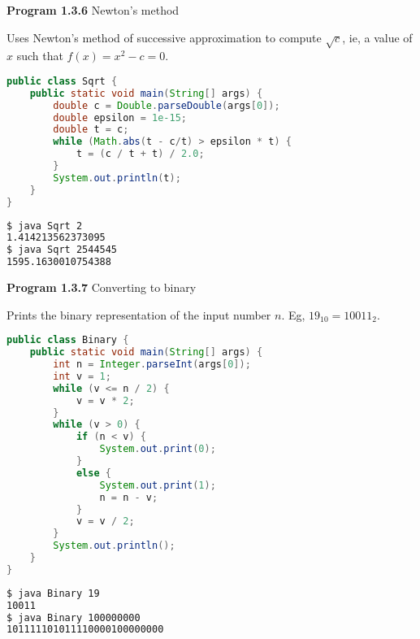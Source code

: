\documentclass[8pt,a4paper,compress]{beamer}
\begin{document}
\begin{frame}[fragile]
\pause

\textbf{Program 1.3.6} Newton's method

\begin{framed}
\tiny Uses Newton's method of successive approximation to compute $\sqrt{c}$, ie, a value of $x$ such that $f(x)=x^2-c=0$.
\end{framed}

\begin{lstlisting}[language=Java]
public class Sqrt { 
    public static void main(String[] args) { 
        double c = Double.parseDouble(args[0]);
        double epsilon = 1e-15;
        double t = c; 
        while (Math.abs(t - c/t) > epsilon * t) {
            t = (c / t + t) / 2.0;
        }
        System.out.println(t);
    }
}
\end{lstlisting}

\pause

\begin{lstlisting}[language=bash]
$ java Sqrt 2
1.414213562373095
$ java Sqrt 2544545
1595.1630010754388
\end{lstlisting}
\end{frame}

\begin{frame}[fragile]
\pause

\textbf{Program 1.3.7} Converting to binary

\begin{framed}
\tiny Prints the binary representation of the input number $n$. Eg, $19_{10}=10011_{2}$.
\end{framed}

\begin{lstlisting}[language=Java]
public class Binary { 
    public static void main(String[] args) { 
        int n = Integer.parseInt(args[0]);
        int v = 1;
        while (v <= n / 2) {
            v = v * 2;
        }
        while (v > 0) {
            if (n < v) { 
                System.out.print(0);
            }
            else {
                System.out.print(1);
                n = n - v;
            }
            v = v / 2;
        }
        System.out.println();
    }
}
\end{lstlisting}

\pause

\begin{lstlisting}[language=bash]
$ java Binary 19
10011
$ java Binary 100000000
101111101011110000100000000
\end{lstlisting}
\end{frame}
\end{document}
